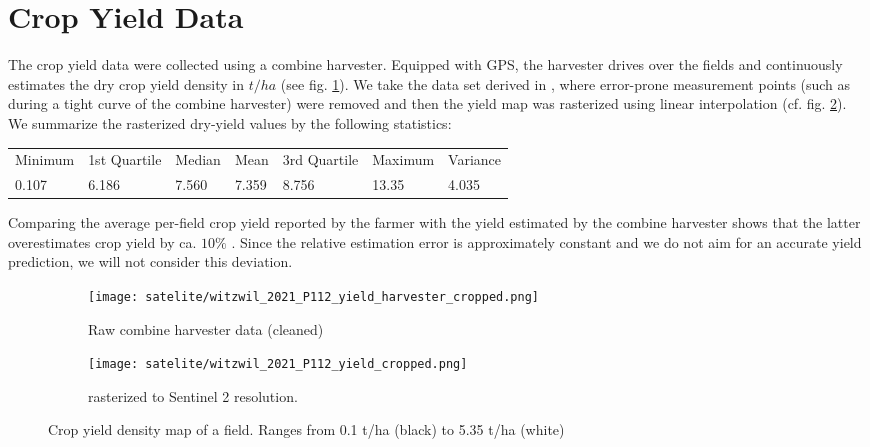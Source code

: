{{		%
		
		

	}
}

\section{Crop Yield Data}{
	\label{sec:yieldmapping_data}
	The crop yield data were collected using a combine harvester. Equipped with GPS, the harvester drives over the fields and continuously estimates the dry crop yield density in $t/ha$ (see fig. \ref{fig:satelite/witzwil_2021_P112_yield_harvester_cropped}). 
	We take the data set derived in \cite{perichPixelbasedCropYield2022}, where error-prone measurement points (such as during a tight curve of the combine harvester) were removed and then the yield map was rasterized using linear interpolation (cf. fig. \ref{fig:satelite/witzwil_2021_P112_yield_cropped.png}). We summarize the rasterized dry-yield values by the following statistics:

	\begin{tabular}{l l l l l l l} 
		Minimum & 1st Quartile & Median & Mean  & 3rd Quartile & Maximum & Variance \\
		0.107   & 6.186        & 7.560  & 7.359 & 8.756        & 13.35   & 4.035
	\end{tabular}    

	Comparing the average per-field crop yield reported by the farmer with the yield estimated by the combine harvester shows that the latter overestimates crop yield by ca. $10\%$ \citep{perichPixelbasedCropYield2022}. Since the relative estimation error is approximately constant and we do not aim for an accurate yield prediction, we will not consider this deviation. 



	\begin{figure}
		\centering
		\begin{subfigure}{.5\textwidth}
			\centering
			\texttt{[image: satelite/witzwil\_2021\_P112\_yield\_harvester\_cropped.png]}
			\caption{Raw combine harvester data (cleaned)}
			\label{fig:satelite/witzwil_2021_P112_yield_harvester_cropped}
		\end{subfigure}%
		\begin{subfigure}{.5\textwidth}
			\centering
			\texttt{[image: satelite/witzwil\_2021\_P112\_yield\_cropped.png]}
			\caption{rasterized to Sentinel 2 resolution.}
			\label{fig:satelite/witzwil_2021_P112_yield_cropped.png}
		\end{subfigure}
		\caption{Crop yield density map of a field. Ranges from 0.1 t/ha (black) to 5.35 t/ha (white) }
		\label{fig:satelite_witzwil_yield}
	\end{figure}

}

